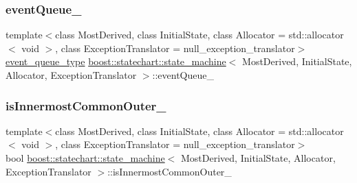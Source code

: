 \mbox{\label{classboost_1_1statechart_1_1state__machine_a54523308f4c5c8aae7fb68cf684e9ba4}} 
\subsubsection{\texorpdfstring{event\+Queue\+\_\+}{eventQueue\_}}
{\footnotesize\ttfamily template$<$class Most\+Derived, class Initial\+State, class Allocator = std\+::allocator$<$ void $>$, class Exception\+Translator = null\+\_\+exception\+\_\+translator$>$ \\
\mbox{\hyperlink{classboost_1_1statechart_1_1state__machine_a308a12082f9cd10b95118871f01e94da}{event\+\_\+queue\+\_\+type}} \mbox{\hyperlink{classboost_1_1statechart_1_1state__machine}{boost\+::statechart\+::state\+\_\+machine}}$<$ Most\+Derived, Initial\+State, Allocator, Exception\+Translator $>$\+::event\+Queue\+\_\+\hspace{0.3cm}{\ttfamily [private]}}

\mbox{\label{classboost_1_1statechart_1_1state__machine_a36642a513713885561837d85a0f7085f}} 
\subsubsection{\texorpdfstring{is\+Innermost\+Common\+Outer\+\_\+}{isInnermostCommonOuter\_}}
{\footnotesize\ttfamily template$<$class Most\+Derived, class Initial\+State, class Allocator = std\+::allocator$<$ void $>$, class Exception\+Translator = null\+\_\+exception\+\_\+translator$>$ \\
bool \mbox{\hyperlink{classboost_1_1statechart_1_1state__machine}{boost\+::statechart\+::state\+\_\+machine}}$<$ Most\+Derived, Initial\+State, Allocator, Exception\+Translator $>$\+::is\+Innermost\+Common\+Outer\+\_\+\hspace{0.3cm}{\ttfamily [private]}}


